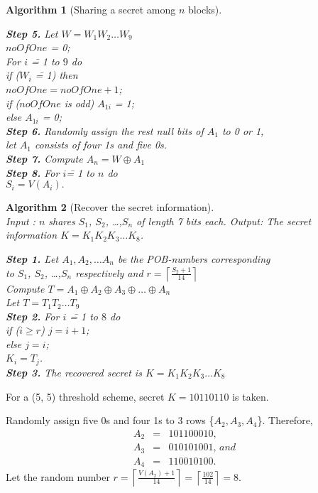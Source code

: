 \documentclass{llncs}
\newtheorem{algorithm}{Algorithm}
\begin{document}
\begin{algorithm}[Sharing a secret among $n$ blocks]
\begin{tabbing}
\textbf{Step 5.}\> Let $W = W_1W_2\ldots W_9$    \\
       \>  $noOfOne$ = 0; \\
       \>  For $i$ \= = 1 to $9$ do \\
       \>\>  if ($W_i$ \= = 1) then \\
       \>\>\>   $noOfOne = noOfOne + 1$; \\
       \>\>\>   if ($noOfOne$ is odd) $A_{1i}$ = 1;\\
       \>\>\>   else $A_{1i}$ = 0;         \\
\textbf{Step 6.}\> Randomly assign the rest null bits of $A_1$ to 0 or 1,\\
                \> let $A_1$ consists of four 1s and five 0s.\\
\textbf{Step 7.}\> Compute $A_n = W \oplus A_1$ \\
\textbf{Step 8.}\> For $i$\= = 1 to $n$ do \\
      \>\>$ S_i = V(A_i).$
       \end{tabbing}
\end{algorithm}
\begin{algorithm}[Recover the  secret  information]\ \\
\label{alg:BRecN}
Input : $n$ shares $S_1$, $S_2$, \ldots ,$S_n$ of length 7 bits each. \newline
Output: The secret information  $K = K_1K_2K_3\ldots K_8$.\\
\begin{tabbing}
\textbf{Step 1.} \= Let $A_1, A_2,\ldots A_n$ be the POB-numbers corresponding\\
                 \> to $S_1$, $S_2$, \ldots ,$S_n$ respectively and $r = \left\lceil\frac{S_2 + 1}{14}\right\rceil$  \\
\>Compute $T = A_1 \oplus A_2 \oplus A_3 \oplus \ldots \oplus A_n$\\
\>Let $T = T_1T_2 \ldots T_9$  \\
\textbf{Step 2.} \> For $i$ \= = 1 to $8$ do \\
           \>\> if ($i \geq r$) $j = i + 1$; \\
           \> else $j = i$; \\
       \>   $K_i = T_j$.\\
\textbf{Step 3.}\> The recovered secret is $K = K_1K_2K_3\ldots K_8$
\end{tabbing}
\end{algorithm}

\begin{example}
For a (5, 5) threshold scheme, secret $K = 10110110$ is taken.
\end{example}
Randomly assign five 0s and four 1s to 3 rows \{$A_2, A_3, A_4$\}. Therefore,
\begin{eqnarray}
  A_2 & = & 101100010, \nonumber \\
  A_3 & = & 010101001,  \, and \nonumber \\
  A_4 & = & 110010100. \nonumber
\end{eqnarray} Let the random number $r = \left\lceil\frac{V(A_2) + 1}{14}\right\rceil = \left\lceil\frac{102}{14}\right\rceil = 8.$
\end{document}

